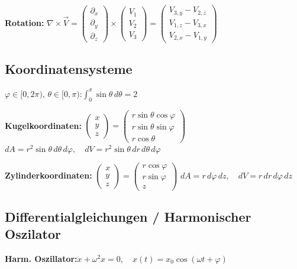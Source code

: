 \documentclass[10pt,a4paper]{article}
\newcommand{\fl}[2]{%
  \noindent #1\hfill$\displaystyle #2$\par\vspace{1pt}}
\begin{document}
\begin{multicols}{2}
\textbf{Rotation:} $\nabla\times\vec{V}=
\begin{pmatrix}\partial_x\\\partial_y\\\partial_z\end{pmatrix}\times
\begin{pmatrix}V_1\\V_2\\V_3\end{pmatrix}=
\begin{pmatrix}V_{3,y}-V_{2,z}\\V_{1,z}-V_{3,x}\\V_{2,x}-V_{1,y}\end{pmatrix}$

\subsection{Koordinatensysteme}

\fl{$\varphi\in[0,2\pi)$, $\theta\in[0,\pi)$:}{\int_0^\pi\sin\theta\,d\theta=2}

\textbf{Kugelkoordinaten:}
$\begin{pmatrix}x\\y\\z\end{pmatrix}=\begin{pmatrix}r\sin\theta\cos\varphi\\r\sin\theta\sin\varphi\\r\cos\theta\end{pmatrix}$
\fl{}{dA=r^2\sin\theta\,d\theta\,d\varphi,\quad dV=r^2\sin\theta\,dr\,d\theta\,d\varphi}

\textbf{Zylinderkoordinaten:}
$\begin{pmatrix}x\\y\\z\end{pmatrix}=\begin{pmatrix}r\cos\varphi\\r\sin\varphi\\z\end{pmatrix}$
\fl{}{dA=r\,d\varphi\,dz,\quad dV=r\,dr\,d\varphi\,dz}

\subsection{Differentialgleichungen / Harmonischer Oszilator}

\fl{\textbf{Harm. Oszillator:}}{\ddot{x}+\omega^2 x=0,\quad x(t)=x_0\cos(\omega t+\varphi)}


\end{multicols}
\end{document}
